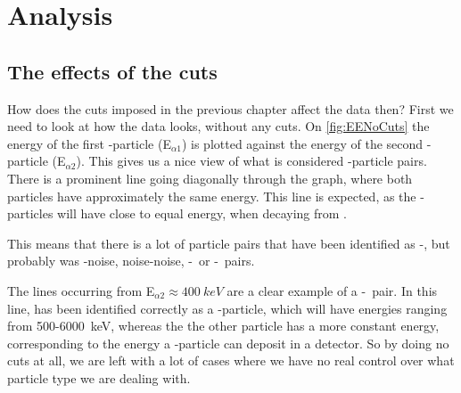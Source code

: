 \chapter{Analysis}
\section{The effects of the cuts}
How does the cuts imposed in the previous chapter affect the data then?
First we need to look at how the data looks, without any cuts. On \cref{fig:EENoCuts} the energy of the first \al-particle (E$_{\alpha1}$) is plotted against the energy of the second \al-particle (E$_{\alpha2}$).
This gives us a nice view of what is considered \al-particle pairs. There is a prominent line going diagonally through the graph, where both particles have approximately the same energy. This line is expected, as the \al-particles will have close to equal energy, when decaying from \ber. 

This means that there is a lot of particle pairs that have been identified as \al-\al, but probably was \al-noise, noise-noise, \al-\be\ or \be-\be\ pairs. 

The lines occurring from E$_{\alpha2} \approx \SI{400}{keV}$ are a clear example of a \al-\be\ pair. In this line,  has been identified correctly as a \al-particle, which will have energies ranging from 500-\SI{6000}{keV}, whereas the the other particle has a more constant energy, corresponding to the energy a \be-particle can deposit in a detector. So by doing no cuts at all, we are left with a lot of cases where we have no real control over what particle type we are dealing with. 

